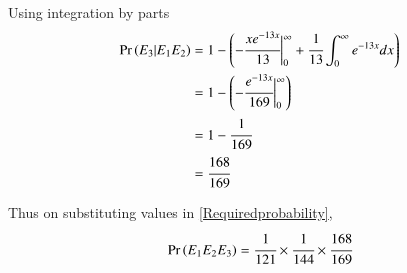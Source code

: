 \documentclass[journal,12pt,twocolumn]{IEEEtran}
\begin{document}
Using integration by parts
\begin{align}
    \Pr\left(E_3|E_1E_2\right) &= 1 -\left( -\cfrac{xe^{-13x}}{13} \biggr \vert_0^{\infty} 
                       + \cfrac{1}{13} \int_0^{\infty}e^{-13x}dx\right)\\
                    &= 1 - \left( -\cfrac{e^{-13x}}{169}\biggr \vert_0^{\infty}\right)\\
                    &= 1 - \cfrac{1}{169}\\
                    &= \cfrac{168}{169}
\end{align}

Thus on substituting values in \eqref{Requiredprobability}, 
\begin{align}
    \Pr\left(E_1E_2E_3\right) = \cfrac{1}{121}\times \cfrac{1}{144}\times \cfrac{168}{169}
\end{align}
\end{document}
